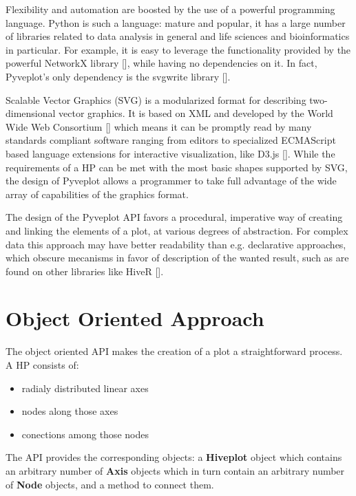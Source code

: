 \documentclass{bioinfo}
\begin{document}
Flexibility and automation are boosted by the use of a powerful
programming language. Python is such a language: mature and popular,
it has a large number of libraries related to data analysis in general
and life sciences and bioinformatics in particular. For example, it is
easy to leverage the functionality provided by the powerful NetworkX
library [\cite{hagberg-2008-exploring}], while having no dependencies
on it. In fact, Pyveplot's only dependency is the svgwrite library
[\cite{svgwrite}].

Scalable Vector Graphics (SVG) is a modularized format for describing
two-dimensional vector graphics. It is based on XML and developed by
the World Wide Web Consortium [\cite{McCormack:11:SVG}] which means it
can be promptly read by many standards compliant software ranging from
editors to specialized ECMAScript based language extensions for
interactive visualization, like D3.js [\cite{bostock2011d3}]. While
the requirements of a HP can be met with the most basic shapes
supported by SVG, the design of Pyveplot allows a programmer to take
full advantage of the wide array of capabilities of the graphics
format.

The design of the Pyveplot API favors a procedural, imperative way of
creating and linking the elements of a plot, at various degrees of
abstraction. For complex data this approach may have better
readability than e.g. declarative approaches, which obscure mecanisms in
favor of description of the wanted result, such as are found on other
libraries like HiveR [\cite{hiveR}].

\section{Object Oriented Approach}

The object oriented API makes the creation of a plot a straightforward
process. A HP consists of:
\begin{itemize}
\item radialy distributed linear axes
\item nodes along those axes
\item conections among those nodes
\end{itemize}
The API provides the corresponding objects: a {\bfseries Hiveplot} object
which contains an arbitrary number of {\bfseries Axis} objects which in
turn contain an arbitrary number of {\bfseries Node} objects, and a method
to connect them.
\end{document}
